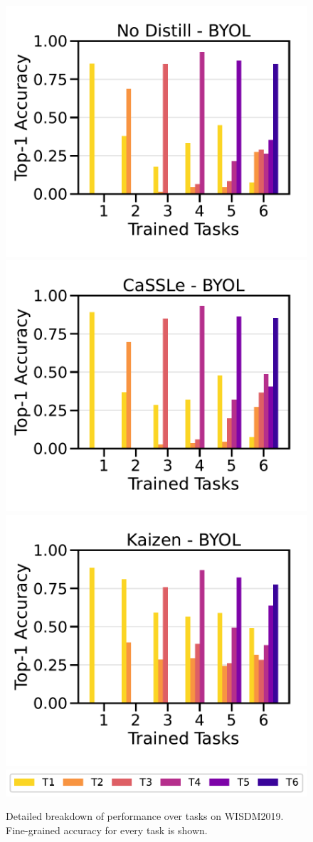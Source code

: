 \begin{figure}[t]
    \includegraphics[width=0.32 \linewidth ]{figures_new/Part_1/F4-WISDM2019-NoDistill-BYOL-6Tasks-v2.pdf}
    \includegraphics[width=0.32 \linewidth ]{figures_new/Part_1/F4-WISDM2019-CaSSLe-BYOL-6Tasks-v2.pdf}
    \includegraphics[width=0.32 \linewidth ]{figures_new/Part_1/F4-WISDM2019-Ours-BYOL-6Tasks-v2.pdf} \\
    \vspace{-0.05in}
    \includegraphics[width=0.65 \linewidth ]{figures_new/Part_1/F4-WISDM2019-6Tasks-v2_legend.pdf}
    \vspace{-0.1in}
    
    \caption{Detailed breakdown of performance over tasks on WISDM2019. Fine-grained accuracy for every task is shown.}
        
    \label{fig:performance_per_task}
\end{figure}

